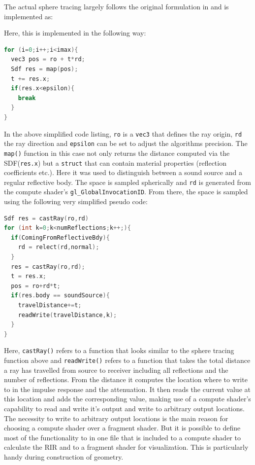 \documentclass[twoside,a4paper]{article}
\begin{document}
The actual sphere tracing largely follows the original formulation in \cite{hart_sphere_1996} and is implemented as:

Here, this is implemented in the following way:
\begin{lstlisting}[language=C, caption={\it GLSL pseudo code for sphere tracing},captionpos=b,label=lst:sphereTrace]
for (i=0;i++;i<imax){
  vec3 pos = ro + t*rd;
  Sdf res = map(pos);
  t += res.x;
  if(res.x<epsilon){
    break
  }
}
\end{lstlisting} 

In the above simplified code listing, \texttt{ro} is a \texttt{vec3} that defines the ray origin, \texttt{rd} the ray direction and \texttt{epsilon} can be set to adjust the algorithms precision. The \texttt{map()} function in this case not only returns the distance computed via the SDF(\texttt{res.x}) but a \texttt{struct} that can contain material properties (reflection coefficients etc.). Here it was used to distinguish between a sound source and a regular reflective body.
The space is sampled spherically and \texttt{rd} is generated from the compute shader's \texttt{gl\_GlobalInvocationID}.
From there, the space is sampled using the following very simplified pseudo code:
\begin{lstlisting}[language=C, caption={\it GLSL pseudo code for sampling the space and writing to the RIR.},captionpos=b, label=lst:mainloop]
Sdf res = castRay(ro,rd)
for (int k=0;k<numReflections;k++;){
  if(ComingFromReflectiveBdy){
    rd = relect(rd,normal);
  }
  res = castRay(ro,rd);
  t = res.x;
  pos = ro+rd*t;
  if(res.body == soundSource){
    travelDistance+=t;
    readWrite(travelDistance,k);
  }
}

\end{lstlisting}

Here, \texttt{castRay()} refers to a function that looks similar to the sphere tracing function above and \texttt{readWrite()} refers to a function that takes the total distance a ray has travelled from source to receiver including all reflections and the number of reflections. From the distance it computes the location where to write to in the impulse response and the attenuation. It then reads the current value at this location and adds the corresponding value, making use of a compute shader's capability to read and write it's output and write to arbitrary output locations. The necessity to write to arbitrary output locations is the main reason for choosing a compute shader over a fragment shader. But it is possible to define most of the functionality to in one file that is included to a compute shader to calculate the RIR and to a fragment shader for visualization. This is particularly handy during construction of geometry.
\end{document}
